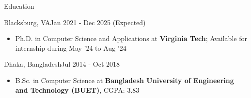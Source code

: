 \documentclass[]{mcdowellcv}
\begin{document}
	\makeheader
	
	\begin{cvsection}{Education}
		\begin{cvsubsection}{Blacksburg, VA}{}{Jan 2021 - Dec 2025 (Expected)}
			\begin{itemize}
				\item Ph.D. in Computer Science and Applications at \textbf{Virginia Tech}; Available for internship during May '24 to Aug '24 %
			\end{itemize}
		\end{cvsubsection}
		\begin{cvsubsection}{Dhaka, Bangladesh}{}{Jul 2014 - Oct 2018}
			\begin{itemize}
				\item B.Sc. in Computer Science at \textbf{Bangladesh University of Engineering and Technology (BUET)}, CGPA: 3.83
			\end{itemize}
		\end{cvsubsection}
	\end{cvsection}
\end{document}
